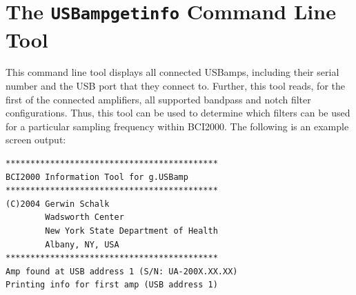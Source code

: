 \documentclass[letterpaper, oneside, 12pt]{article}
\begin{document}
\section{The \texttt{USBampgetinfo} Command Line Tool}

This command line tool displays all connected USBamps, including their serial 
number and the USB port that they connect to. Further, this tool reads, for the 
first of the connected amplifiers, all supported bandpass and notch filter 
configurations. Thus, this tool can be used to determine which filters can be 
used for a particular sampling frequency within BCI2000. The following is an 
example screen output:

\begin{verbatim}
*******************************************
BCI2000 Information Tool for g.USBamp
*******************************************
(C)2004 Gerwin Schalk
        Wadsworth Center
        New York State Department of Health
        Albany, NY, USA
*******************************************
Amp found at USB address 1 (S/N: UA-200X.XX.XX)
Printing info for first amp (USB address 1)


\end{verbatim}
\end{document}
